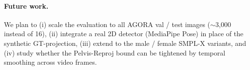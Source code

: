 \documentclass[conference]{IEEEtran}
\begin{document}
\paragraph{Future work.}
We plan to (i) scale the evaluation to all AGORA val / test images ($\sim$3,000 instead of 16), (ii) integrate a real 2D detector (MediaPipe Pose) in place of the synthetic GT-projection, (iii) extend to the male / female SMPL-X variants, and (iv) study whether the Pelvis-Reproj bound can be tightened by temporal smoothing across video frames.



\end{document}
